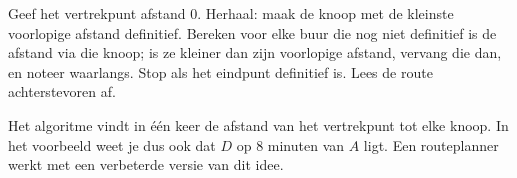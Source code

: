 \begin{werkwijze}
Geef het vertrekpunt afstand 0. Herhaal: maak de knoop met de kleinste voorlopige afstand definitief. Bereken voor elke buur die nog niet definitief is de afstand via die knoop; is ze kleiner dan zijn voorlopige afstand, vervang die dan, en noteer waarlangs. Stop als het eindpunt definitief is. Lees de route achterstevoren af.
\end{werkwijze}

Het algoritme vindt in één keer de afstand van het vertrekpunt tot elke knoop. In het voorbeeld weet je dus ook dat $D$ op 8 minuten van $A$ ligt. Een routeplanner werkt met een verbeterde versie van dit idee.

\begin{oefeningen}

\end{oefeningen}

\opdrachtenkop


